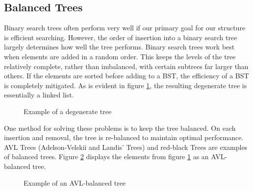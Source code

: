 \subsection*{Balanced Trees}
Binary search trees often perform very well if our primary goal for our structure is efficient searching.
However, the order of insertion into a binary search tree largely determines how well the tree performs.
Binary search trees work best when elements are added in a random order.
This keeps the levels of the tree relatively complete, rather than imbalanced, with certain subtrees far larger than others.
If the elements are sorted before adding to a BST, the efficiency of a BST is completely mitigated.
As is evident in figure \ref{fig:Degenerate Tree}, the resulting degenerate tree is essentially a linked list.
\begin{figure}[h]
\centering
{}
\caption{Example of a degenerate tree}
\label{fig:Degenerate Tree}
\end{figure}

One method for solving these problems is to keep the tree balanced.
On each insertion and removal, the tree is re-balanced to maintain optimal performance.
AVL Trees (Adelson-Velskii and Landis' Trees) and red-black Trees are examples of balanced trees.
Figure \ref{fig:AVL btree} displays the elements from figure \ref{fig:Degenerate Tree} as an AVL-balanced tree.
\begin{figure}[h]
\centering
{}
\caption{Example of an AVL-balanced tree}
\label{fig:AVL btree}
\end{figure}

